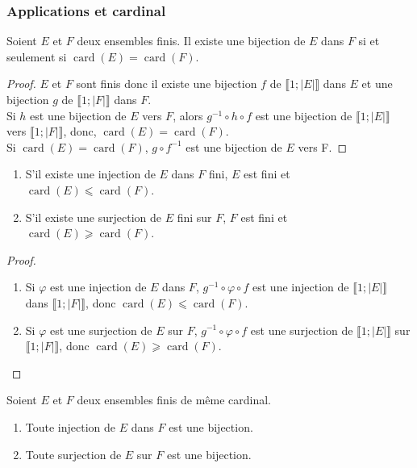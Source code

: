 \subsubsection{Applications et cardinal}
\begin{theorem}
Soient \(𝐸\) et \(𝐹\) deux ensembles finis. Il existe une bijection de \(𝐸\) dans \(𝐹\) si et seulement si
\(\operatorname{card}(𝐸)=\operatorname{card}(𝐹)\).
\end{theorem}
\begin{proof}
 \(𝐸\) et \(𝐹\) sont finis donc il existe une bijection \(𝑓\) de \(⟦1;|𝐸|⟧\) dans \(𝐸\) et une bijection \(𝑔\) de
\(⟦1;|𝐹|⟧\) dans \(𝐹\).
\\
Si \(ℎ\) est une bijection de \(𝐸\) vers \(𝐹\), alors \(𝑔^{-1}\circ ℎ\circ 𝑓\) est une bijection de \(⟦1;|𝐸|⟧\)
vers \(⟦1;|𝐹|⟧\), donc, \(\operatorname{card}(𝐸)=\operatorname{card}(𝐹)\).
\\
Si \(\operatorname{card}(𝐸)=\operatorname{card}(𝐹)\), \(𝑔\circ 𝑓^{-1}\) est une bijection de \(𝐸\) vers F.
\end{proof}
\begin{theorem}
\par\noindent
\begin{enumerate}
\item S'il existe une injection de \(𝐸\) dans \(𝐹\) fini, \(𝐸\) est fini et
\(\operatorname{card}(𝐸)⩽\operatorname{card}(𝐹)\).
\item S'il existe une surjection de \(𝐸\) fini sur \(𝐹\), \(𝐹\) est fini et
\(\operatorname{card}(𝐸)⩾\operatorname{card}(𝐹)\).
\end{enumerate}
\end{theorem}
\begin{proof}
\par\noindent
\begin{enumerate}
\item Si \(𝜑\) est une injection de \(𝐸\) dans \(𝐹\), \(𝑔^{-1}∘𝜑∘𝑓\) est une injection de \(⟦1;|𝐸|⟧\) dans
\(⟦1;|𝐹|⟧\), donc \(\operatorname{card}(𝐸)⩽\operatorname{card}(𝐹)\).
\item Si \(𝜑\) est une surjection de \(𝐸\) sur \(𝐹\), \(𝑔^{-1}∘𝜑∘𝑓\) est une surjection de \(⟦1;|𝐸|⟧\) sur
\(⟦1;|𝐹|⟧\), donc \(\operatorname{card}(𝐸)⩾\operatorname{card}(𝐹)\).
\end{enumerate}
\end{proof}
%
%
\begin{theorem}
Soient \(𝐸\) et \(𝐹\) deux ensembles finis de même cardinal.
\begin{enumerate}
\item Toute injection de \(𝐸\) dans \(𝐹\) est une bijection.
\item Toute surjection de \(𝐸\) sur \(𝐹\) est une bijection.
\end{enumerate}
\end{theorem}
